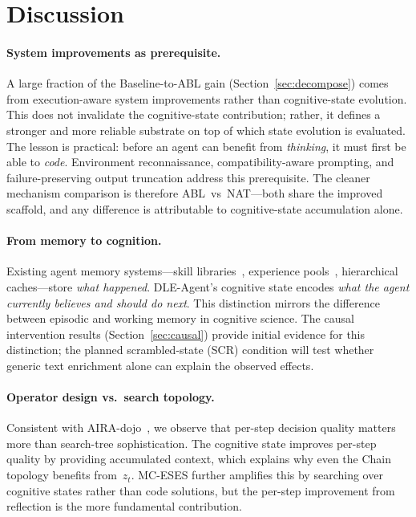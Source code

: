 \documentclass{article} %
\newcommand{\zt}{z_t}
\begin{document}
\section{Discussion}
\label{sec:discussion}

\paragraph{System improvements as prerequisite.}
A large fraction of the Baseline-to-ABL gain (Section~\ref{sec:decompose})
comes from execution-aware system improvements rather than cognitive-state
evolution. This does not invalidate the cognitive-state contribution; rather,
it defines a stronger and more reliable substrate on top of which state
evolution is evaluated. The lesson is practical: before an agent can benefit
from \emph{thinking}, it must first be able to \emph{code}. Environment
reconnaissance, compatibility-aware prompting, and failure-preserving output
truncation address this prerequisite. The cleaner mechanism comparison is
therefore ABL~vs~NAT---both share the improved scaffold, and any difference
is attributable to cognitive-state accumulation alone.

\paragraph{From memory to cognition.}
Existing agent memory systems---skill libraries~\citep{wang2023voyager},
experience pools~\citep{zhao2024expel}, hierarchical
caches---store \emph{what happened}. DLE-Agent's cognitive state encodes
\emph{what the agent currently believes and should do next}. This distinction
mirrors the difference between episodic and working memory in cognitive
science. The causal intervention results (Section~\ref{sec:causal}) provide
initial evidence for this distinction; the planned scrambled-state (SCR)
condition will test whether generic text enrichment alone can explain the
observed effects.

\paragraph{Operator design vs.\ search topology.}
Consistent with AIRA-dojo~\citep{airadojo2025}, we observe that per-step
decision quality matters more than search-tree sophistication. The cognitive
state improves per-step quality by providing accumulated context, which
explains why even the Chain topology benefits from~$\zt$. MC-ESES further
amplifies this by searching over cognitive states rather than code solutions,
but the per-step improvement from reflection is the more fundamental
contribution.
\end{document}
